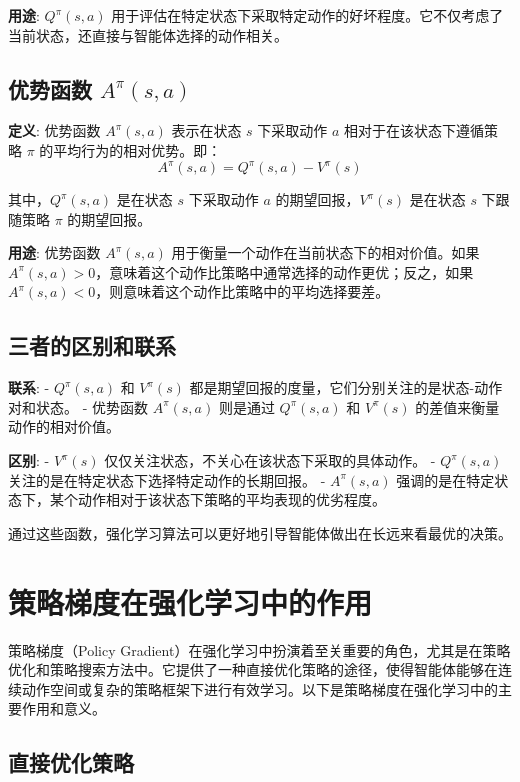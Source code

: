 \documentclass[twocolumn, 10pt]{article} %
\theoremstyle{remark}
\begin{document}
\textbf{用途}:
\( Q^\pi(s, a) \) 用于评估在特定状态下采取特定动作的好坏程度。它不仅考虑了当前状态，还直接与智能体选择的动作相关。

\subsection{优势函数 \( A^\pi(s, a) \)}

\textbf{定义}:
优势函数 \( A^\pi(s, a) \) 表示在状态 \( s \) 下采取动作 \( a \) 相对于在该状态下遵循策略 \( \pi \) 的平均行为的相对优势。即：
\[
A^\pi(s, a) = Q^\pi(s, a) - V^\pi(s)
\]

其中，\( Q^\pi(s, a) \) 是在状态 \( s \) 下采取动作 \( a \) 的期望回报，\( V^\pi(s) \) 是在状态 \( s \) 下跟随策略 \( \pi \) 的期望回报。

\textbf{用途}:
优势函数 \( A^\pi(s, a) \) 用于衡量一个动作在当前状态下的相对价值。如果 \( A^\pi(s, a) > 0 \)，意味着这个动作比策略中通常选择的动作更优；反之，如果 \( A^\pi(s, a) < 0 \)，则意味着这个动作比策略中的平均选择要差。

\subsection{三者的区别和联系}

\textbf{联系}:
- \( Q^\pi(s, a) \) 和 \( V^\pi(s) \) 都是期望回报的度量，它们分别关注的是状态-动作对和状态。
- 优势函数 \( A^\pi(s, a) \) 则是通过 \( Q^\pi(s, a) \) 和 \( V^\pi(s) \) 的差值来衡量动作的相对价值。

\textbf{区别}:
- \( V^\pi(s) \) 仅仅关注状态，不关心在该状态下采取的具体动作。
- \( Q^\pi(s, a) \) 关注的是在特定状态下选择特定动作的长期回报。
- \( A^\pi(s, a) \) 强调的是在特定状态下，某个动作相对于该状态下策略的平均表现的优劣程度。

通过这些函数，强化学习算法可以更好地引导智能体做出在长远来看最优的决策。

\section{策略梯度在强化学习中的作用}

策略梯度（Policy Gradient）在强化学习中扮演着至关重要的角色，尤其是在策略优化和策略搜索方法中。它提供了一种直接优化策略的途径，使得智能体能够在连续动作空间或复杂的策略框架下进行有效学习。以下是策略梯度在强化学习中的主要作用和意义。

\subsection{直接优化策略}
\end{document}
